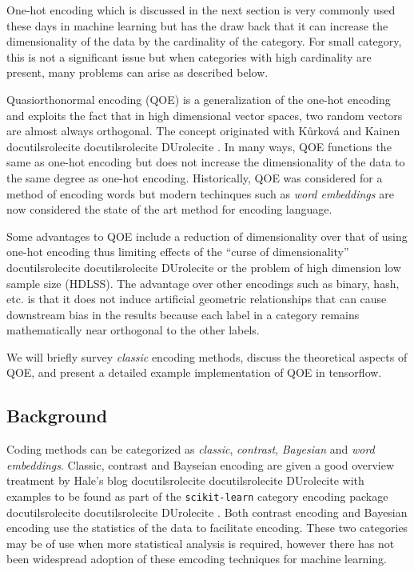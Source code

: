 \documentclass[]{article}
\providecommand*{\DUrole}[2]{%
  \ifcsname docutilsrole#1\endcsname%
    \csname docutilsrole#1\endcsname{#2}%
  \else
    \csname DUrole#1\endcsname{#2}%
  \fi%
}
\begin{document}
One-hot encoding which is discussed in the next section is very
commonly used these days in machine learning but has the draw back
that it can increase the dimensionality of the data by the cardinality
of the category. For small category, this is not a significant issue
but when categories with high cardinality are present, many problems
can arise as described below.

Quasiorthonormal encoding (QOE) is a generalization of the one-hot
encoding and exploits the fact that in high dimensional vector spaces,
two random vectors are almost always orthogonal. The concept originated
with Kůrková and Kainen \DUrole{cite}{kurkova}. In many ways, QOE functions
the same as one-hot encoding but does not increase the dimensionality
of the data to the same degree as one-hot encoding. Historically, QOE
was considered for a method of encoding words but modern techinques
such as \emph{word embeddings} are now considered the state of the art
method for encoding language.

Some advantages to QOE include a reduction of dimensionality over that
of using one-hot encoding thus limiting effects of the ``curse of
dimensionality'' \DUrole{cite}{wiki:curse} or the problem of high dimension low sample size
(HDLSS). The advantage over other encodings such as binary, hash, etc.
is that it does not induce artificial geometric relationships that can
cause downstream bias in the results because each label in a category
remains mathematically near orthogonal to the other labels.

We will briefly survey \emph{classic} encoding methods, discuss the
theoretical aspects of QOE, and present a detailed example implementation
of QOE in tensorflow.

\subsection{Background%
  \label{background}%
}


Coding methods can be categorized as \emph{classic}, \emph{contrast},
\emph{Bayesian} and \emph{word embeddings}. Classic, contrast and Bayseian
encoding are given a good overview treatment by Hale's blog
\DUrole{cite}{Hale2018} with examples to be found as part of the \texttt{scikit-learn} category
encoding package \DUrole{cite}{scikit}. Both
contrast encoding and Bayesian encoding use the statistics of the data
to facilitate encoding. These two categories may be of use when more
statistical analysis is required, however there has not been widespread
adoption of these emcoding techniques for machine learning.
\end{document}

